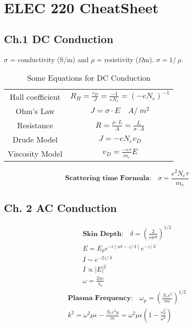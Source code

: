\chapter{ELEC 220 CheatSheet}
\begin{multicols}{3}

\section{Ch.1 DC Conduction}
$\sigma$ = conductivity (S/m) and $ \rho$ = resistivity ($ \Omega $m). $\sigma = 1 /\ \rho $. 
\begin{table}
\begin{tabular}{c|c}
	Hall coefficient    & $R_H= \frac{v_D}{J}=\frac{-1}{eN_e}=(-eN_e)^{-1}$ \\
	Ohm's Law  & $J = \sigma \cdot E \quad A /\ m^{2}$\\ 
	Resistance & $R= \frac{\rho \cdot  L}{A}= \frac{L}{\sigma \cdot A}$ \\
	Drude Model  & $J = -eN_ev_D$ \\
	Viscosity Model  & $v_D=\frac{-e\tau}{m_e}E$
\end{tabular}
\caption{Some Equations for DC Conduction}
\end{table}
$$\textbf{Scattering time Formula:} \quad \sigma= \frac{e^2N_e\tau}{m_e} $$

\section{Ch. 2 AC Conduction}
\begin{align} 
\textbf{Skin Depth:} \quad \delta= 
\left(\frac{2}{\omega \mu \sigma}\right)^{1/2} \\
E= E_0e^{-i(wt-z/\ \delta)}e^{-z/\ \delta} \\
I \sim e^{-2z /\ \delta} \\
I \propto |E|^{2} \\
\omega = \frac{2\pi c}{\lambda_o}
\end{align} 
\begin{align} 
\textbf{Plasma Frequency:} \quad \omega_p= 
\left(\frac{N_ee^2}{m \epsilon}\right)^{1/2} \\
k^2= \omega^2 \mu \epsilon - \frac{N_ee^2\mu}{m}= \omega^2\mu\epsilon\left(1-\frac{\omega_p^2}{\omega^2}\right)
\end{align} 

\end{multicols}
